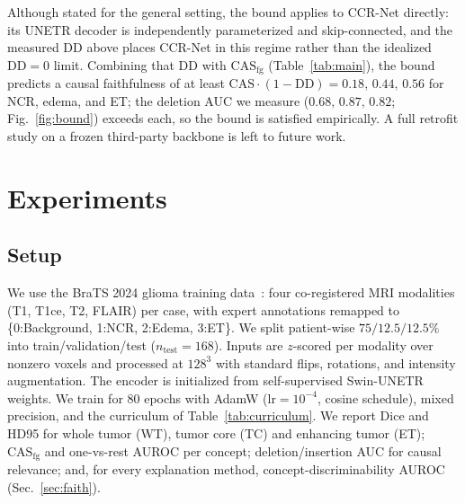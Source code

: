 \documentclass[runningheads]{llncs}
\newcommand{\casfg}{\mathrm{CAS}_{\mathrm{fg}}}
\begin{document}
\medskip\noindent
Although stated for the general setting, the bound applies to CCR-Net directly: its UNETR
decoder is independently parameterized and skip-connected, and the measured $\mathrm{DD}$ above
places CCR-Net in this regime rather than the idealized $\mathrm{DD}{=}0$ limit. Combining that
DD with $\casfg$ (Table~\ref{tab:main}), the bound predicts a causal faithfulness of at least
$\mathrm{CAS}\cdot(1-\mathrm{DD})=0.18,\,0.44,\,0.56$ for NCR, edema, and ET; the deletion AUC
we measure ($0.68,\,0.87,\,0.82$; Fig.~\ref{fig:bound}) exceeds each, so the bound is
satisfied empirically. A full retrofit study on a frozen third-party backbone is left to
future work.

\section{Experiments}\label{sec:experiments}
\subsection{Setup}
We use the BraTS 2024 glioma training data~\cite{menze2014brats,baid2021brats}: four
co-registered MRI modalities (T1, T1ce, T2, FLAIR) per case, with expert annotations
remapped to \{0:Background, 1:NCR, 2:Edema, 3:ET\}. We split patient-wise
$75/12.5/12.5\%$ into train/validation/test ($n_{\text{test}}{=}168$). Inputs are
$z$-scored per modality over nonzero voxels and processed at $128^3$ with standard flips,
rotations, and intensity augmentation. The encoder is initialized from self-supervised
Swin-UNETR weights. We train for $80$ epochs with AdamW ($\text{lr}{=}10^{-4}$, cosine
schedule), mixed precision, and the curriculum of Table~\ref{tab:curriculum}. We report
Dice and HD95 for whole tumor (WT), tumor core (TC) and enhancing tumor (ET); $\casfg$ and
one-vs-rest AUROC per concept; deletion/insertion AUC for causal relevance; and, for every
explanation method, concept-discriminability AUROC (Sec.~\ref{sec:faith}).
\end{document}
